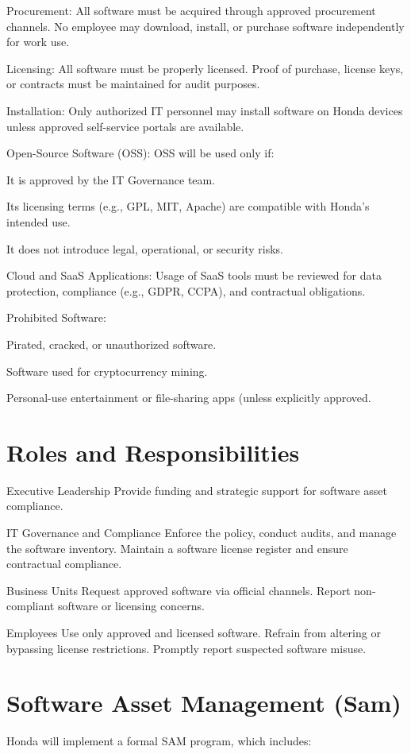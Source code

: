 Procurement: All software must be acquired through approved procurement channels. No employee may download, install, or purchase software independently for work use.

Licensing: All software must be properly licensed. Proof of purchase, license keys, or contracts must be maintained for audit purposes.

Installation: Only authorized IT personnel may install software on Honda devices unless approved self-service portals are available.

Open-Source Software (OSS): OSS will be used only if:

    It is approved by the IT Governance team.

    Its licensing terms (e.g., GPL, MIT, Apache) are compatible with Honda’s intended use.

    It does not introduce legal, operational, or security risks.

Cloud and SaaS Applications: Usage of SaaS tools must be reviewed for data protection, compliance (e.g., GDPR, CCPA), and contractual obligations.

Prohibited Software:

Pirated, cracked, or unauthorized software.

Software used for cryptocurrency mining.

Personal-use entertainment or file-sharing apps (unless explicitly approved.

\section{Roles and Responsibilities}

Executive Leadership
    Provide funding and strategic support for software asset compliance.

IT Governance and Compliance
    Enforce the policy, conduct audits, and manage the software inventory.
    Maintain a software license register and ensure contractual compliance.

Business Units
    Request approved software via official channels.
    Report non-compliant software or licensing concerns.

Employees
    Use only approved and licensed software.
    Refrain from altering or bypassing license restrictions.
    Promptly report suspected software misuse.

\section{Software Asset Management (Sam)}
Honda will implement a formal SAM program, which includes:

